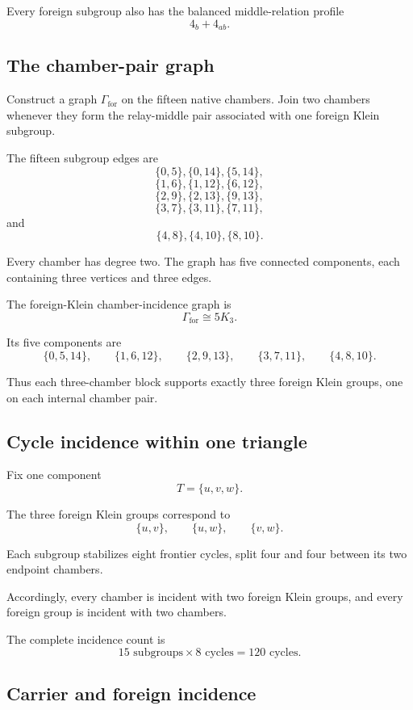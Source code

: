 Every foreign subgroup also has the balanced middle-relation profile
\[
4_b+4_{ab}.
\]

\subsection{The chamber-pair graph}

Construct a graph \(\Gamma_{\mathrm{for}}\) on the fifteen native
chambers. Join two chambers whenever they form the relay-middle pair
associated with one foreign Klein subgroup.

The fifteen subgroup edges are
\[
\{0,5\},\{0,14\},\{5,14\},
\]
\[
\{1,6\},\{1,12\},\{6,12\},
\]
\[
\{2,9\},\{2,13\},\{9,13\},
\]
\[
\{3,7\},\{3,11\},\{7,11\},
\]
and
\[
\{4,8\},\{4,10\},\{8,10\}.
\]

Every chamber has degree two. The graph has five connected
components, each containing three vertices and three edges.

\begin{theorem}
The foreign-Klein chamber-incidence graph is
\[
\Gamma_{\mathrm{for}}
\cong
5K_3.
\]
\end{theorem}

Its five components are
\[
\{0,5,14\},
\qquad
\{1,6,12\},
\qquad
\{2,9,13\},
\qquad
\{3,7,11\},
\qquad
\{4,8,10\}.
\]

Thus each three-chamber block supports exactly three foreign Klein
groups, one on each internal chamber pair.

\subsection{Cycle incidence within one triangle}

Fix one component
\[
T=\{u,v,w\}.
\]

The three foreign Klein groups correspond to
\[
\{u,v\},
\qquad
\{u,w\},
\qquad
\{v,w\}.
\]

Each subgroup stabilizes eight frontier cycles, split four and four
between its two endpoint chambers.

Accordingly, every chamber is incident with two foreign Klein groups,
and every foreign group is incident with two chambers.

The complete incidence count is
\[
15\text{ subgroups}\times8\text{ cycles}
=
120\text{ cycles}.
\]

\subsection{Carrier and foreign incidence}

